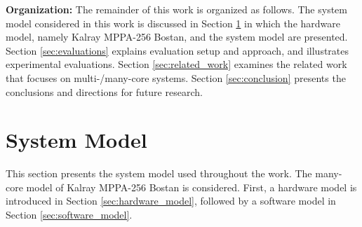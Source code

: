   \textbf{Organization:}
  The remainder of this work is organized as follows.
  The system model considered in this work is discussed in Section \ref{sec:system_model} in which the hardware model, namely Kalray MPPA-256 Bostan, and the system model are presented.
  Section \ref{sec:evaluations} explains evaluation setup and approach, and illustrates experimental evaluations.
  Section \ref{sec:related_work} examines the related work that focuses on multi-/many-core systems.
  Section \ref{sec:conclusion} presents the conclusions and directions for future research.

  
  \chapter{System Model}
  \label{sec:system_model}
  This section presents the system model used throughout the work.
  The many-core model of Kalray MPPA-256 Bostan is considered.
  First, a hardware model is introduced in Section \ref{sec:hardware_model}, followed by a software model in Section \ref{sec:software_model}.
  
